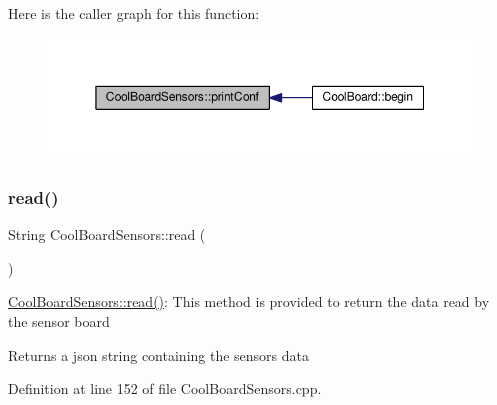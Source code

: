 Here is the caller graph for this function\+:\nopagebreak
\begin{figure}[H]
\begin{center}
\leavevmode
\includegraphics[width=350pt]{de/d46/class_cool_board_sensors_af6fd79505815b204c178617ecf54c873_icgraph}
\end{center}
\end{figure}
\mbox{\label{class_cool_board_sensors_a91badb2539d91fda8679f2a597874c48}} 
\subsubsection{\texorpdfstring{read()}{read()}}
{\footnotesize\ttfamily String Cool\+Board\+Sensors\+::read (\begin{DoxyParamCaption}{ }\end{DoxyParamCaption})}

\hyperlink{class_cool_board_sensors_a91badb2539d91fda8679f2a597874c48}{Cool\+Board\+Sensors\+::read()}\+: This method is provided to return the data read by the sensor board

\begin{DoxyReturn}{Returns}
a json string containing the sensors data 
\end{DoxyReturn}


Definition at line 152 of file Cool\+Board\+Sensors.\+cpp.


